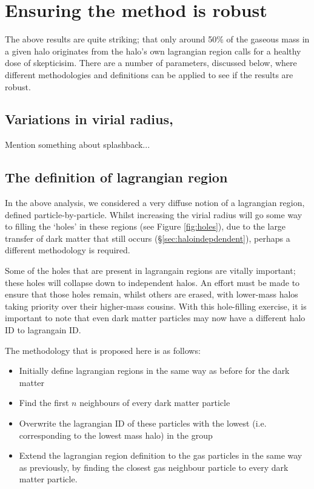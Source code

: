 \section{Ensuring the method is robust}
\label{sec:robustness}

The above results are quite striking; that only around 50\% of the gaseous
mass in a given halo originates from the halo's own lagrangian region calls
for a healthy dose of skepticisim. There are a number of parameters, discussed
below, where different methodologies and definitions can be applied to see
if the results are robust.

\subsection{Variations in virial radius, \rvir{}}

Mention something about splashback...

\subsection{The definition of lagrangian region}

In the above analysis, we considered a very diffuse notion of a lagrangian
region, defined particle-by-particle. Whilst increasing the virial radius
will go some way to filling the `holes' in these regions (see Figure
\ref{fig:holes}), due to the large transfer of dark matter that still occurs
(\S \ref{sec:haloindepdendent}), perhaps a different methodology is required.

Some of the holes that are present in lagrangain regions are vitally important;
these holes will collapse down to independent halos. An effort must be made
to ensure that those holes remain, whilst others are erased, with lower-mass
halos taking priority over their higher-mass cousins. With this hole-filling
exercise, it is important to note that even dark matter particles may now
have a different halo ID to lagrangain ID.

The methodology that is proposed here is as follows:
\begin{itemize}
    \item Initially define lagrangian regions in the same way as before for
          the dark matter
    \item Find the first $n$ neighbours of every dark matter particle
    \item Overwrite the lagrangian ID of these particles with the lowest (i.e.
          corresponding to the lowest mass halo) in the group
    \item Extend the lagrangian region definition to the gas particles in
          the same way as previously, by finding the closest gas neighbour
	  particle to every dark matter particle.
\end{itemize}


